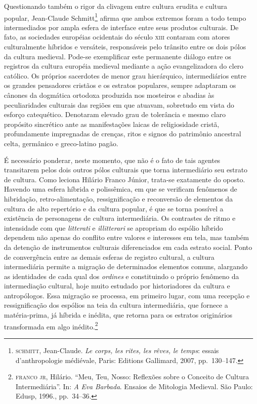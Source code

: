 Questionando também o rigor da clivagem entre cultura erudita e cultura
popular, Jean-Claude Schmitt\footnote{ \textsc{schmitt}, Jean-Claude. \textit{Le
corps, les rites, les rêves, le temps}: essais d’anthropologie
médiévale, Paris: Editions Gallimard, 2007, pp.~130--147.} afirma que
ambos extremos foram a todo tempo intermediados por ampla esfera de
interface entre seus produtos culturais. De fato, as sociedades
européias ocidentais do século \textsc{xiii} contaram com atores culturalmente
híbridos e versáteis, responsáveis pelo trânsito entre os dois pólos da
cultura medieval. Pode-se exemplificar este permanente diálogo entre os
registros da cultura européia medieval mediante a ação evangelizadora
do clero católico. Os próprios sacerdotes de menor grau hierárquico,
intermediários entre os grandes pensadores cristãos e os estratos
populares, sempre adaptaram os cânones da dogmática ortodoxa produzida
nos mosteiros e abadias às peculiaridades culturais das regiões em que
atuavam, sobretudo em vista do esforço catequético. Denotaram elevado
grau de tolerância e mesmo claro propósito sincrético ante as
manifestações laicas de religiosidade cristã, profundamente impregnadas
de crenças, ritos e signos do patrimônio ancestral celta, germânico e
greco-latino pagão. 

É necessário ponderar, neste momento, que não é o fato de tais agentes
transitarem pelos dois outros pólos culturais que torna intermediário
seu estrato de cultura. Como leciona Hilário Franco Júnior, trata-se
exatamente do oposto. Havendo uma esfera híbrida e polissêmica, em que
se verificam fenômenos de hibridação, retro-alimentação,
ressignificação e reconversão de elementos da cultura de alto
repertório e da cultura popular, é que se torna possível a existência
de personagens de cultura intermediária. Os contrastes de ritmo e
intensidade com que \textit{litterati} e \textit{illitterari} se
apropriam do espólio híbrido dependem não apenas do conflito entre
valores e interesses em tela, mas também da detenção de instrumentos
culturais diferenciados em cada estrato social. Ponto de convergência
entre as demais esferas de registro cultural, a cultura intermediária
permite a migração de determinados elementos comuns, alargando as
identidades de cada qual dos \textit{ordines} e constituindo o próprio
fenômeno da intermediação cultural, hoje muito estudado por
historiadores da cultura e antropólogos. Essa migração se processa, em
primeiro lugar, com uma recepção e ressignificação dos espólios na teia
da cultura intermediária, que fornece a matéria-prima, já híbrida e
inédita, que retorna para os estratos originários transformada em algo
inédito.\footnote{ \textsc{franco jr}, Hilário. “Meu, Teu, Nosso: Reflexões sobre
o Conceito de Cultura Intermediária”. In: \textit{A Eva Barbada}.
Ensaios de Mitologia Medieval. São Paulo: Edusp, 1996., pp.~34--36.}

